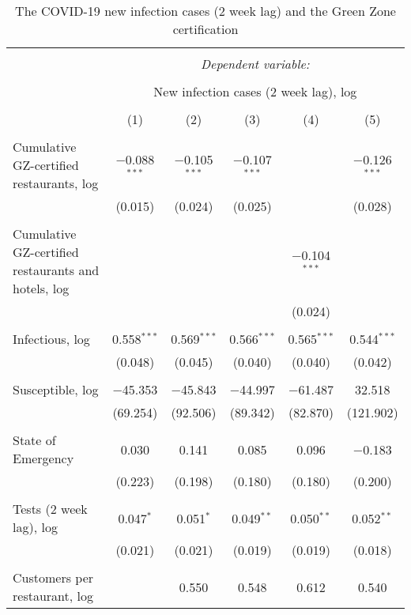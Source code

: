 
\begin{table}[H] \centering 
  \caption{The COVID-19 new infection cases (2 week lag) and the Green Zone certification} 
  \label{} 
\scriptsize 
\begin{tabular}{@{\extracolsep{1pt}}lccccc} 
\\[-1.8ex]\hline 
\hline \\[-1.8ex] 
 & \multicolumn{5}{c}{\textit{Dependent variable:}} \\ 
\cline{2-6} 
\\[-1.8ex] & \multicolumn{5}{c}{New infection cases (2 week lag), log} \\ 
\\[-1.8ex] & (1) & (2) & (3) & (4) & (5)\\ 
\hline \\[-1.8ex] 
 Cumulative GZ-certified restaurants, log & $-$0.088$^{***}$ & $-$0.105$^{***}$ & $-$0.107$^{***}$ &  & $-$0.126$^{***}$ \\ 
  & (0.015) & (0.024) & (0.025) &  & (0.028) \\ 
  & & & & & \\ 
 Cumulative GZ-certified restaurants and hotels, log &  &  &  & $-$0.104$^{***}$ &  \\ 
  &  &  &  & (0.024) &  \\ 
  & & & & & \\ 
 Infectious, log & 0.558$^{***}$ & 0.569$^{***}$ & 0.566$^{***}$ & 0.565$^{***}$ & 0.544$^{***}$ \\ 
  & (0.048) & (0.045) & (0.040) & (0.040) & (0.042) \\ 
  & & & & & \\ 
 Susceptible, log & $-$45.353 & $-$45.843 & $-$44.997 & $-$61.487 & 32.518 \\ 
  & (69.254) & (92.506) & (89.342) & (82.870) & (121.902) \\ 
  & & & & & \\ 
 State of Emergency & 0.030 & 0.141 & 0.085 & 0.096 & $-$0.183 \\ 
  & (0.223) & (0.198) & (0.180) & (0.180) & (0.200) \\ 
  & & & & & \\ 
 Tests (2 week lag), log & 0.047$^{*}$ & 0.051$^{*}$ & 0.049$^{**}$ & 0.050$^{**}$ & 0.052$^{**}$ \\ 
  & (0.021) & (0.021) & (0.019) & (0.019) & (0.018) \\ 
  & & & & & \\ 
 Customers per restaurant, log &  & 0.550 & 0.548 & 0.612 & 0.540 \\ 

\end{tabular}
\end{table}
